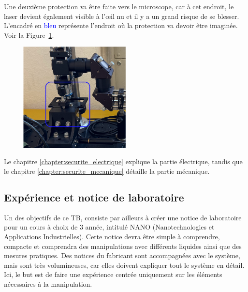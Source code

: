 \begin{minipage}{\textwidth}
    Une deuxième protection va être faite vers le microscope, car à cet endroit, le laser devient également visible à l'\oe{}il nu et il y a un grand risque de se blesser. L'encadré en \textcolor{blue}{bleu} représente l'endroit où la protection va devoir être imaginée. Voir la Figure~\ref{protection_laser_fin}.
    \vspace{1em}
    \begin{figure}[H]
        \begin{center}
            \includegraphics[width=0.5\textwidth]{assets/figures/Introduction/protection_fin_laser.png}
        \end{center}
        \label{protection_laser_fin}
    \end{figure}
\end{minipage}

\vspace{1em}
Le chapitre \ref{chapter:securite_electrique} explique la partie électrique, tandis que le chapitre \ref{chapter:securite_mecanique} détaille la partie mécanique.

\subsection{Expérience et notice de laboratoire}

Un des objectifs de ce TB, consiste par ailleurs à créer une notice de laboratoire pour un cours à choix de 3\ieme{} année, intitulé NANO (Nanotechnologies et Applications Industrielles). Cette notice devra être simple à comprendre, compacte et comprendra des manipulations avec différents liquides ainsi que des mesures pratiques. Des notices du fabricant sont accompagnées avec le système, mais sont très volumineuses, car elles doivent expliquer tout le système en détail. Ici, le but est de faire une expérience centrée uniquement sur les éléments nécessaires à la manipulation.

